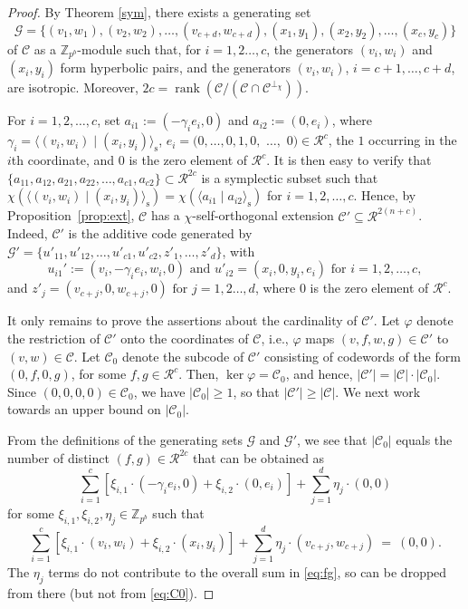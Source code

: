 \documentclass{article}
\DeclareMathOperator{\rank}{rank}
\theoremstyle{remark}
\theoremstyle{definition}
\numberwithin{equation}{section}
\begin{document}
\begin{proof} By Theorem \ref{sym}, there exists a generating set  $$\mathcal{G}=\{(v_1,w_1),(v_2,w_2),\ldots, (v_{c+d},w_{c+d}),(x_1,y_1),(x_2,y_2),\ldots, (x_{c},y_{c})\}$$ of $\mathcal{C}$ as a $\mathbb{Z}_{p^b}$-module such that, for $i = 1,2\ldots,c$, the generators $(v_i,w_i)$ and $(x_i,y_i)$ form hyperbolic pairs, and the generators $(v_i,w_i)$, $i = c+1,\ldots,c+d$, are isotropic. Moreover, $2c = \rank(\mathcal{C}/(\mathcal{C} \cap \mathcal{C}^{\perp_\chi})) .$

For $i = 1,2,\ldots,c$, set $a_{i1} := (-\gamma_i e_i,0)$ and $a_{i2} := (0,e_i)$, where $\gamma_i = \langle(v_i,w_i) \mid (x_i,y_i)\rangle_{\text{s}}$, $e_i = (0,\ldots,0,1,0,$ $\ldots,$ $0) \in \mathcal{R}^c$, the $1$ occurring in the $i$th coordinate, and $0$ is the zero element of $\mathcal{R}^c$. It is then easy to verify that $\{a_{11},a_{12},a_{21},a_{22},\ldots,a_{c1},a_{c2}\} \subset \mathcal{R}^{2c}$ is a symplectic subset such that $\chi(\langle (v_i,w_i) \mid (x_i,y_i) \rangle_{\text{s}}) = \chi(\langle a_{i1} \mid a_{i2} \rangle_{\text{s}})$ for $i=1,2,\ldots,c$.  Hence, by Proposition~\ref{prop:ext}, $\mathcal{C}$ has a $\chi$-self-orthogonal extension $\mathcal{C}' \subseteq \mathcal{R}^{2(n+c)}$. Indeed, $\mathcal{C}'$ is the additive code generated by $\mathcal{G}' = \{u'_{11},u'_{12},\ldots,u'_{c1},u'_{c2},z'_1,\ldots,z'_d\}$, with 
$$
 u_{i1}' := (v_i,-\gamma_i e_i,w_i,0) \text{ and }  u'_{i2} = (x_i,0,y_i,e_i)  \text{ for } i = 1,2,\ldots,c,
 $$
 and  $z'_j = (v_{c+j},0,w_{c+j},0) \text{ for } j=1,2\ldots,d$, where $0$ is the zero element of $\mathcal{R}^c$.

It only remains to prove the assertions about the cardinality of $\mathcal{C}'$. Let $\varphi$ denote the restriction of $\mathcal{C}'$ onto the coordinates of $\mathcal{C}$, i.e., $\varphi$ maps $(v,f,w,g) \in \mathcal{C}'$ to $(v,w) \in \mathcal{C}$. Let $\mathcal{C}_0$ denote the subcode of $\mathcal{C}'$ consisting of codewords of the form $(0,f,0,g)$, for some $f,g \in \mathcal{R}^c$. Then, $\ker \varphi = \mathcal{C}_0$, and hence, $|\mathcal{C}'| = |\mathcal{C}| \cdot |\mathcal{C}_0|$. Since $(0,0,0,0) \in \mathcal{C}_0$, we have $|\mathcal{C}_0| \ge 1$, so that $|\mathcal{C}'| \ge |\mathcal{C}|$. We next work towards an upper bound on $|\mathcal{C}_0|$.

From the definitions of the generating sets $\mathcal{G}$ and $\mathcal{G}'$, we see that $|\mathcal{C}_0|$ equals the number of distinct $(f,g) \in \mathcal{R}^{2c}$ that can be obtained as 
\begin{equation}
\sum_{i=1}^c [\xi_{i,1} \cdot (-\gamma_ie_i,0) + \xi_{i,2} \cdot (0,e_i)] + \sum_{j=1}^d \eta_j \cdot (0,0)
\label{eq:fg}
\end{equation}
for some  $\xi_{i,1},\xi_{i,2},\eta_j \in \mathbb{Z}_{p^b}$ such that 
\begin{equation}
\sum_{i=1}^c [\xi_{i,1} \cdot (v_i,w_i) + \xi_{i,2} \cdot (x_i,y_i)] + \sum_{j=1}^d \eta_j \cdot (v_{c+j},w_{c+j}) \ = \ (0,0).
\label{eq:C0}
\end{equation}
The $\eta_j$ terms do not contribute to the overall sum in \eqref{eq:fg}, so can be dropped from there (but not from \eqref{eq:C0}).


\end{proof}
\end{document}
